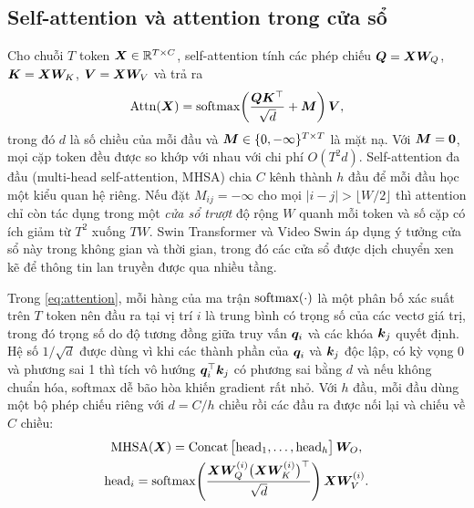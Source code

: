 \subsection{Self-attention và attention trong cửa sổ}
\label{sec:attention}

Cho chuỗi $T$ token $\bm{X} \in \mathbb{R}^{T \times C}$, self-attention \cite{vaswani2017attention} tính các phép chiếu $\bm{Q} = \bm{X}\bm{W}_Q$, $\bm{K} = \bm{X}\bm{W}_K$, $\bm{V} = \bm{X}\bm{W}_V$ và trả ra
\begin{equation}
\mathrm{Attn}(\bm{X}) = \operatorname{softmax}\!\left(\frac{\bm{Q}\bm{K}^{\top}}{\sqrt{d}} + \bm{M}\right)\bm{V},
\label{eq:attention}
\end{equation}
trong đó $d$ là số chiều của mỗi đầu và $\bm{M} \in \{0, -\infty\}^{T \times T}$ là mặt nạ. Với $\bm{M} = \bm{0}$, mọi cặp token đều được so khớp với nhau với chi phí $O(T^2 d)$. Self-attention đa đầu (multi-head self-attention, MHSA) chia $C$ kênh thành $h$ đầu để mỗi đầu học một kiểu quan hệ riêng. Nếu đặt $M_{ij} = -\infty$ cho mọi $|i - j| > \lfloor W/2 \rfloor$ thì attention chỉ còn tác dụng trong một \emph{cửa sổ trượt} độ rộng $W$ quanh mỗi token \cite{beltagy2020longformer} và số cặp có ích giảm từ $T^2$ xuống $TW$. Swin Transformer \cite{liu2021swin} và Video Swin \cite{liu2022videoswin} áp dụng ý tưởng cửa sổ này trong không gian và thời gian, trong đó các cửa sổ được dịch chuyển xen kẽ để thông tin lan truyền được qua nhiều tầng.

Trong \cref{eq:attention}, mỗi hàng của ma trận $\operatorname{softmax}(\cdot)$ là một phân bố xác suất trên $T$ token nên đầu ra tại vị trí $i$ là trung bình có trọng số của các vectơ giá trị, trong đó trọng số do độ tương đồng giữa truy vấn $\bm{q}_i$ và các khóa $\bm{k}_j$ quyết định. Hệ số $1/\sqrt{d}$ được dùng vì khi các thành phần của $\bm{q}_i$ và $\bm{k}_j$ độc lập, có kỳ vọng 0 và phương sai 1 thì tích vô hướng $\bm{q}_i^{\top}\bm{k}_j$ có phương sai bằng $d$ và nếu không chuẩn hóa, softmax dễ bão hòa khiến gradient rất nhỏ. Với $h$ đầu, mỗi đầu dùng một bộ phép chiếu riêng với $d = C/h$ chiều rồi các đầu ra được nối lại và chiếu về $C$ chiều:
\begin{equation}
\begin{gathered}
\mathrm{MHSA}(\bm{X}) = \operatorname{Concat}\big[\mathrm{head}_1, \dots, \mathrm{head}_h\big]\,\bm{W}_O,\\
\mathrm{head}_i = \operatorname{softmax}\!\left(\frac{\bm{X}\bm{W}_Q^{(i)}\big(\bm{X}\bm{W}_K^{(i)}\big)^{\top}}{\sqrt{d}}\right)\bm{X}\bm{W}_V^{(i)}.
\end{gathered}
\label{eq:mhsa}
\end{equation}

